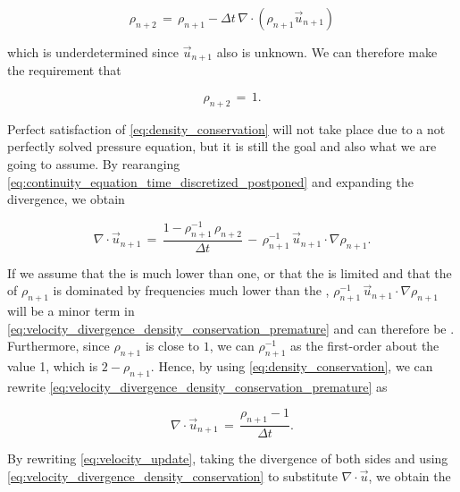 \begin{equation} \label{eq:continuity_equation_time_discretized_postponed}
\rho_{n+2} \,=\, \rho_{n+1} - \Delta t\,\nabla\cdot(\rho_{n+1}\vec{u}_{n+1})
\end{equation}

which is underdetermined since $\vec{u}_{n+1}$ also is unknown. We can therefore make the requirement that

\begin{equation} \label{eq:density_conservation}
\rho_{n+2} \,=\, 1.
\end{equation}

Perfect satisfaction of \eqref{eq:density_conservation} will not take place due to a not perfectly solved pressure equation, but it is still the goal and also what we are going to assume. By rearanging \eqref{eq:continuity_equation_time_discretized_postponed} and expanding the divergence, we obtain

\begin{equation} \label{eq:velocity_divergence_density_conservation_premature}
\nabla\cdot\vec{u}_{n+1} \,=\, \frac{1-\rho_{n+1}^{-1}\,\rho_{n+2}}{\Delta t} \,-\, \rho_{n+1}^{-1}\,\vec{u}_{n+1}\cdot\nabla\rho_{n+1}.
\end{equation}

If we assume that the  is much lower than one, or that the  is limited and that the \spectrum of $\rho_{n+1}$ is dominated by frequencies much lower than the , $\rho_{n+1}^{-1}\,\vec{u}_{n+1}\cdot\nabla\rho_{n+1}$ will be a minor term in \eqref{eq:velocity_divergence_density_conservation_premature} and can therefore be \neglected. Furthermore, since $\rho_{n+1}$ is close to $1$, we can \approximate $\rho_{n+1}^{-1}$ as the first-order  about the value 1, which is $2-\rho_{n+1}$. Hence, by using \eqref{eq:density_conservation}, we can rewrite \eqref{eq:velocity_divergence_density_conservation_premature} as

\begin{equation} \label{eq:velocity_divergence_density_conservation}
\nabla\cdot\vec{u}_{n+1} \,=\, \frac{\rho_{n+1}-1}{\Delta t}.
\end{equation}

By rewriting \eqref{eq:velocity_update}, taking the divergence of both sides and using \eqref{eq:velocity_divergence_density_conservation} to substitute $\nabla\cdot\vec{u}$, we obtain the 

